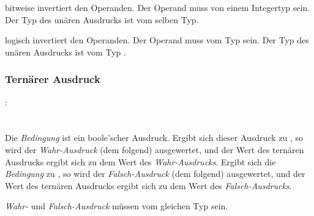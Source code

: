 \op{$\sim$} bitweise invertiert den Operanden. Der Operand muss von einem Integertyp sein. Der Typ des unären Ausdrucks ist vom selben Typ.

\op{!} logisch invertiert den Operanden. Der Operand muss vom Typ  sein. Der Typ des unären Ausdrucks ist vom Typ .

\subsubsection{Ternärer Ausdruck}\label{Ternaerer Ausdruck}
:\label{asdr_ternaer}\\
\hspace*{1cm} \\
\hspace*{1cm} \glq{}\grq  {}  \glq\Gt{:}\grq  {} \\

Die \emph{Bedingung} ist ein boole'scher Ausdruck. Ergibt sich dieser Ausdruck zu ,
so wird der \emph{Wahr-Ausdruck} (dem  folgend) ausgewertet, und der Wert des ternären
Ausdrucks ergibt sich zu dem Wert des \emph{Wahr-Ausdrucks}.
Ergibt sich die \emph{Bedingung} zu , so wird der \emph{Falsch-Ausdruck} (dem \kw{:} folgend)
ausgewertet, und der Wert des ternären
Ausdrucks ergibt sich zu dem Wert des \emph{Falsch-Ausdrucks}.

\emph{Wahr-} und \emph{Falsch-Ausdruck} müssen vom gleichen Typ sein.


